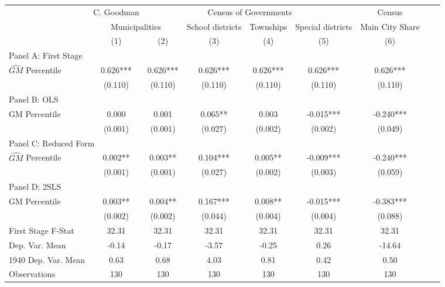  \begin{tabular}{l*{8}{c}} \toprule
&\multicolumn{1}{c}{C. Goodman}&\multicolumn{4}{c}{Census of Governments}&\multicolumn{1}{c}{Census}\\\cmidrule(lr){2-2}\cmidrule(lr){3-6}\cmidrule(lr){7-7}
&\multicolumn{2}{c}{Municipalities}&\multicolumn{1}{c}{School districts}&\multicolumn{1}{c}{Townships}&\multicolumn{1}{c}{Special districts}&\multicolumn{1}{c}{Main City Share}\\\cmidrule(lr){2-3}\cmidrule(lr){4-6}\cmidrule(lr){7-7}
&\multicolumn{1}{c}{(1)}&\multicolumn{1}{c}{(2)}&\multicolumn{1}{c}{(3)}&\multicolumn{1}{c}{(4)}&\multicolumn{1}{c}{(5)}&\multicolumn{1}{c}{(6)}\\
\cmidrule(lr){1-7}
\multicolumn{6}{l}{Panel A: First Stage}\\
\cmidrule(lr){1-7}
$\widehat{GM}$ Percentile&    0.626***&    0.626***&    0.626***&    0.626***&    0.626***&    0.626***\\
                &  (0.110)   &  (0.110)   &  (0.110)   &  (0.110)   &  (0.110)   &  (0.110)   \\
\cmidrule(lr){1-7}
\multicolumn{6}{l}{Panel B: OLS}\\
\cmidrule(lr){1-7}
GM Percentile   &    0.000   &    0.001   &    0.065** &    0.003   &   -0.015***&   -0.240***\\
                &  (0.001)   &  (0.001)   &  (0.027)   &  (0.002)   &  (0.002)   &  (0.049)   \\
\cmidrule(lr){1-7}
\multicolumn{6}{l}{Panel C: Reduced Form}\\
\cmidrule(lr){1-7}
$\widehat{GM}$ Percentile&    0.002** &    0.003** &    0.104***&    0.005** &   -0.009***&   -0.240***\\
                &  (0.001)   &  (0.001)   &  (0.027)   &  (0.002)   &  (0.003)   &  (0.059)   \\
\cmidrule(lr){1-7}
\multicolumn{6}{l}{Panel D: 2SLS}\\
\cmidrule(lr){1-7}
GM Percentile   &    0.003** &    0.004** &    0.167***&    0.008** &   -0.015***&   -0.383***\\
                &  (0.002)   &  (0.002)   &  (0.044)   &  (0.004)   &  (0.004)   &  (0.088)   \\
\midrule
First Stage F-Stat&    32.31   &    32.31   &    32.31   &    32.31   &    32.31   &    32.31   \\
Dep. Var. Mean  &    -0.14   &    -0.17   &    -3.57   &    -0.25   &     0.26   &   -14.64   \\
1940 Dep. Var. Mean&     0.63   &     0.68   &     4.03   &     0.81   &     0.42   &     0.50   \\
Observations    &      130   &      130   &      130   &      130   &      130   &      130   \\
       \bottomrule \end{tabular}
